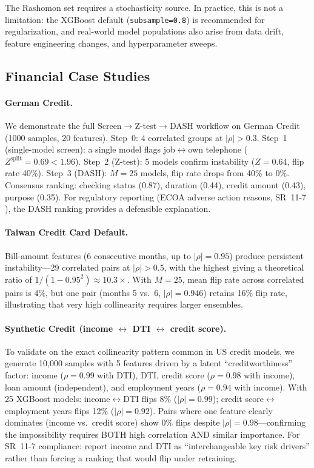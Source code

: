 \documentclass{jmlr}
\begin{document}
The Rashomon set requires a stochasticity source.
In practice, this is not a limitation: the XGBoost default (\texttt{subsample=0.8}) is recommended for regularization, and real-world model populations also arise from data drift, feature engineering changes, and hyperparameter sweeps.

\subsection{Financial Case Studies}

\paragraph{German Credit.}
We demonstrate the full Screen$\to$Z-test$\to$DASH workflow on German Credit (1000 samples, 20 features). Step~0: 4 correlated groups at $|\rho| > 0.3$. Step~1 (single-model screen): a single model flags job$\leftrightarrow$own telephone ($Z^{\text{split}} = 0.69 < 1.96$). Step~2 (Z-test): 5 models confirm instability ($Z = 0.64$, flip rate 40\%). Step~3 (DASH): $M = 25$ models, flip rate drops from 40\% to 0\%. Consensus ranking: checking status (0.87), duration (0.44), credit amount (0.43), purpose (0.35). For regulatory reporting (ECOA adverse action reasons, SR~11-7 \citep{occ2011sr117}), the DASH ranking provides a defensible explanation.

\paragraph{Taiwan Credit Card Default.}
Bill-amount features (6 consecutive months, up to $|\rho| = 0.95$) produce persistent instability---29 correlated pairs at $|\rho| > 0.5$, with the highest giving a theoretical ratio of $1/(1{-}0.95^2) \approx 10.3\times$. With $M = 25$, mean flip rate across correlated pairs is 4\%, but one pair (months 5 vs.\ 6, $|\rho| = 0.946$) retains 16\% flip rate, illustrating that very high collinearity requires larger ensembles.

\paragraph{Synthetic Credit (income $\leftrightarrow$ DTI $\leftrightarrow$ credit score).}
To validate on the exact collinearity pattern common in US credit models, we generate 10{,}000 samples with 5 features driven by a latent ``creditworthiness'' factor: income ($\rho = 0.99$ with DTI), DTI, credit score ($\rho = 0.98$ with income), loan amount (independent), and employment years ($\rho = 0.94$ with income). With 25 XGBoost models: income$\leftrightarrow$DTI flips 8\% ($|\rho| = 0.99$); credit score$\leftrightarrow$employment years flips 12\% ($|\rho| = 0.92$). Pairs where one feature clearly dominates (income vs.\ credit score) show 0\% flips despite $|\rho| = 0.98$---confirming the impossibility requires BOTH high correlation AND similar importance. For SR~11-7 \citep{occ2011sr117} compliance: report income and DTI as ``interchangeable key risk drivers'' rather than forcing a ranking that would flip under retraining.
\end{document}
